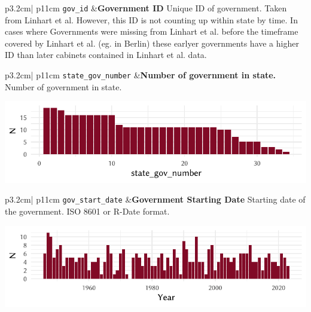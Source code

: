 \documentclass[
]{scrartcl}
\begin{document}
\begin{longtable}{p{3.2cm}| p{11cm}}
\texttt{gov\_id} &\textbf{Government ID}\newline 
Unique ID of government. Taken from Linhart et al. However, this ID is not counting up within state by time. In cases where Governments were 
           missing from Linhart et al. before the timeframe covered by Linhart et al. (eg. in Berlin) these earlyer governments have a higher ID than later cabinets 
           contained in Linhart et al. data.
\end{longtable}

\begin{longtable}{p{3.2cm}| p{11cm}}
\texttt{state\_gov\_number} &\textbf{Number of government in state.}\newline 
Number of government in state.



\hspace*{.25cm}
\begin{minipage}[t]{\linewidth }
\vspace{0pt}
\includegraphics[width = \linewidth]{cbfiles/stategovnumplot.pdf}
\end{minipage}



\end{longtable}

\begin{longtable}{p{3.2cm}| p{11cm}}
\texttt{gov\_start\_date} &\textbf{Government Starting Date}\newline 
Starting date of the government.  ISO 8601 or R-Date format.






\hspace*{.25cm}
\begin{minipage}[t]{\linewidth }
\vspace{0pt}
\includegraphics[width = \linewidth]{cbfiles/govstartdatesplot.pdf}
\end{minipage}






\end{longtable}
\end{document}
